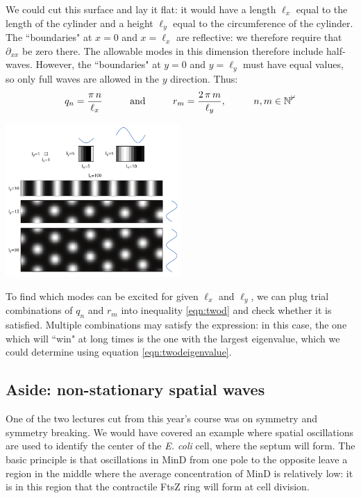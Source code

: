 \documentclass{article}
\begin{document}
We could cut this surface and lay it flat: it would have a length $\ell_x$ equal to the length of the cylinder and a height $\ell_y$ equal to the circumference of the cylinder. The ``boundaries" at $x=0$ and $x=\ell_x$ are reflective: we therefore require that $\partial_{xx}$ be zero there. The allowable modes in this dimension therefore include half-waves. However, the ``boundaries" at $y=0$ and $y=\ell_y$ must have equal values, so only full waves are allowed in the $y$ direction. Thus:
\[ q_n = \frac{\pi \, n}{\ell_x} \hspace{1 cm} \textrm{and} \hspace{1 cm} r_m = \frac{2 \, \pi \, m}{\ell_y} , \hspace{1 cm} n, m \in \mathbb{N^0} \]

\begin{center}
\includegraphics[width=0.5\textwidth]{first_modes_excited.pdf}
\end{center}

To find which modes can be excited for given $\ell_x$ and $\ell_y$, we can plug trial combinations of $q_n$ and $r_m$ into inequality \ref{eqn:twod} and check whether it is satisfied. Multiple combinations may satisfy the expression: in this case, the one which will ``win" at long times is the one with the largest eigenvalue, which we could determine using equation \ref{eqn:twodeigenvalue}.

\subsection*{Aside: non-stationary spatial waves}

One of the two lectures cut from this year's course was on symmetry and symmetry breaking. We would have covered an example where spatial oscillations are used to identify the center of the \textit{E. coli} cell, where the septum will form. The basic principle is that oscillations in MinD from one pole to the opposite leave a region in the middle where the average concentration of MinD is relatively low: it is in this region that the contractile FtsZ ring will form at cell division.\\
\end{document}
